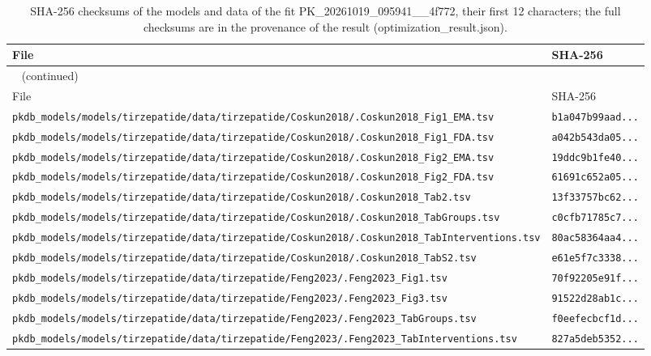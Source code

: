 \documentclass{article}
\begin{document}
\begin{longtable}{ll}
\caption{SHA-256 checksums of the models and data of the fit PK\_20261019\_095941\_\_4f772, their first 12 characters; the full checksums are in the provenance of the result (optimization\_result.json).}\label{tab:checksums:PK_20261019_095941__4f772} \\
\toprule
File & SHA-256 \\
\midrule
\endfirsthead
\multicolumn{2}{l}{\small\tablename~\thetable{} (continued)} \\
\toprule
File & SHA-256 \\
\midrule
\endhead
\bottomrule
\endlastfoot
\texttt{pkdb\_models/models/tirzepatide/data/tirzepatide/Coskun2018/.Coskun2018\_Fig1\_EMA.tsv} & \texttt{b1a047b99aad...} \\
\texttt{pkdb\_models/models/tirzepatide/data/tirzepatide/Coskun2018/.Coskun2018\_Fig1\_FDA.tsv} & \texttt{a042b543da05...} \\
\texttt{pkdb\_models/models/tirzepatide/data/tirzepatide/Coskun2018/.Coskun2018\_Fig2\_EMA.tsv} & \texttt{19ddc9b1fe40...} \\
\texttt{pkdb\_models/models/tirzepatide/data/tirzepatide/Coskun2018/.Coskun2018\_Fig2\_FDA.tsv} & \texttt{61691c652a05...} \\
\texttt{pkdb\_models/models/tirzepatide/data/tirzepatide/Coskun2018/.Coskun2018\_Tab2.tsv} & \texttt{13f33757bc62...} \\
\texttt{pkdb\_models/models/tirzepatide/data/tirzepatide/Coskun2018/.Coskun2018\_TabGroups.tsv} & \texttt{c0cfb71785c7...} \\
\texttt{pkdb\_models/models/tirzepatide/data/tirzepatide/Coskun2018/.Coskun2018\_TabInterventions.tsv} & \texttt{80ac58364aa4...} \\
\texttt{pkdb\_models/models/tirzepatide/data/tirzepatide/Coskun2018/.Coskun2018\_TabS2.tsv} & \texttt{e61e5f7c3338...} \\
\texttt{pkdb\_models/models/tirzepatide/data/tirzepatide/Feng2023/.Feng2023\_Fig1.tsv} & \texttt{70f92205e91f...} \\
\texttt{pkdb\_models/models/tirzepatide/data/tirzepatide/Feng2023/.Feng2023\_Fig3.tsv} & \texttt{91522d28ab1c...} \\
\texttt{pkdb\_models/models/tirzepatide/data/tirzepatide/Feng2023/.Feng2023\_TabGroups.tsv} & \texttt{f0eefecbcf1d...} \\
\texttt{pkdb\_models/models/tirzepatide/data/tirzepatide/Feng2023/.Feng2023\_TabInterventions.tsv} & \texttt{827a5deb5352...} \\

\end{longtable}
\end{document}
